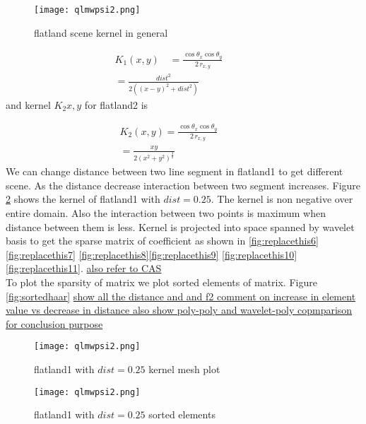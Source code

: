 \begin{figure}[tbh]
\centering{}
\captionsetup{justification=centering}
\texttt{[image: qlmwpsi2.png]}
\caption{\label{fig:replacethis4}flatland scene kernel in general}
\end{figure}


\begin{eqnarray} \label{eq:kernelflatland1}
K_1(x,y)\quad=\frac{   \cos{\theta_x}  \cos{\theta_y}  }{    2\,r_{x,y}   }\quad\quad\quad\\
        =\frac{dist^2}{2((x-y)^2+dist^2)}
\end{eqnarray}
and kernel  $K_2{x,y}$ for flatland2 is

\begin{eqnarray} \label{eq:kernelflatland2}
K_2(x,y)=\frac{\cos{\theta_x}\cos{\theta_y}}{2\,r_{x,y}} \quad\quad\quad\\
=\frac{xy}{2(x^2+y^2)^{\frac{3}{2}}}\quad\quad\quad
\end{eqnarray}
We can change distance between two line segment in flatland1 to get different scene. As the distance decrease interaction between two segment increases. Figure \ref{fig:replacethis5} shows the kernel of flatland1 with $dist=0.25$. The kernel is non negative over entire domain. Also the interaction between two points is maximum when distance between them is less. Kernel is projected into space spanned by wavelet basis to get the sparse matrix of coefficient as shown in \ref{fig:replacethis6} \ref{fig:replacethis7} \ref{fig:replacethis8}\ref{fig:replacethis9} \ref{fig:replacethis10} \ref{fig:replacethis11}. \underline{also refer to CAS} \\

To plot the sparsity of matrix we plot sorted elements of matrix. Figure \ref{fig:sortedhaar}
\underline{show all the distance and and f2 comment on increase in element value vs decrease in distance also show poly-poly and wavelet-poly copmparison for conclusion purpose }

\begin{figure}[tbh]
\centering{}
\captionsetup{justification=centering}
\texttt{[image: qlmwpsi2.png]}
\caption{\label{fig:replacethis5}flatland1 with $dist=0.25$ kernel mesh plot}
\end{figure}
\begin{figure}[tbh]
\centering{}
\captionsetup{justification=centering}
\texttt{[image: qlmwpsi2.png]}
\caption{\label{fig:f10.25sortedhaar}flatland1 with $dist=0.25$ sorted elements}
\end{figure}


